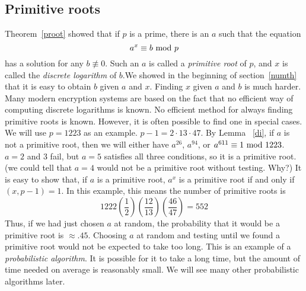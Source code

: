 \subsection{Primitive roots}
Theorem~\ref{proot} showed that if $p$ is a prime, there is an $a$ such that
the equation $$a^x\equiv b\hbox{ mod }p$$has a solution for any $b\not\equiv0$.
Such an $a$ is called a {\it primitive root\/} of $p$, and $x$
is called the {\it discrete logarithm\/} of $b$.\pq We showed in
the beginning of section~\ref{numth} that it is easy to obtain $b$ given
$a$ and $x$.  Finding $x$ given $a$ and $b$ is much harder.  Many modern
encryption systems are based on the fact that no efficient way of
computing discrete logarithms is known.
\pq No efficient method for always finding primitive roots is known.
However, it is often possible to find one in special cases.
We will use $p=1223$ as an example.  $p-1=2\cdot13\cdot47$. By Lemma~%
\ref{di}, if $a$ is not a primitive root, then we will either have
$a^{26}$, $a^{94}$, or $a^{611}\equiv1\hbox{ mod }1223$.  $a=2$ and 3 fail, but
$a=5$ satisfies all three conditions, so it is a primitive root.  (we
could tell that $a=4$ would not be a primitive root without testing.  Why?)
\pq It is easy to show that, if $a$ is a primitive root, $a^x$ is a
primitive root if and only if $(x,p-1)=1$.  In this example, this means
the number of primitive roots is$$1222\left(\frac12\right)\left(\frac
{12}{13}\right)\left(\frac{46}{47}\right)=552$$Thus, if we had just chosen
$a$ at random, the probability that it would be a primitive root is
$\approx.45$.  Choosing $a$ at random and testing until we found a
primitive root would not be expected to take too long.
\pq This is an example of a {\it probabilistic algorithm}.  It is possible
for it to take a long time, but the amount of time needed on average is
reasonably small.  We will see many other probabilistic algorithms later.
